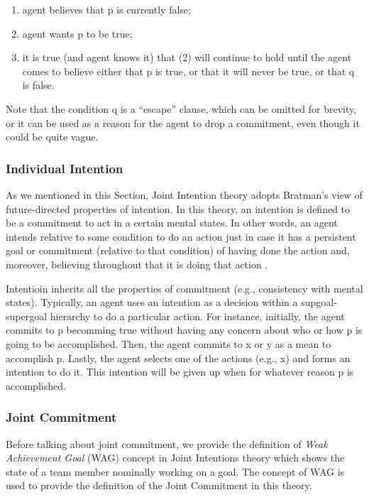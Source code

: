\documentclass[11pt]{article}
\begin{document}
\begin{enumerate}
  \item agent believes that p is currently false;
  \item agent wants p to be true;
  \item it is true (and agent knows it) that (2) will continue to hold until the
  agent comes to believe either that p is true, or that it will never be true,
  or that q is false.
\end{enumerate}

Note that the condition q is a ``escape'' clause, which can be omitted for
brevity, or it can be used as a reason for the agent to drop a commitment, even
though it could be quite vague.

\subsubsection{Individual Intention}
\label{sec:individual-intention}

As we mentioned in this Section, Joint Intention theory adopts Bratman's view of
future-directed properties of intention. In this theory, an intention is
defined to be a commitment to act in a certain mental states. In other words, an
agent intends relative to some condition to do an action just in case it has a
persistent goal or commitment (relative to that condition) of having done the
action and, moreover, believing throughout that it is doing that action
\cite{cohen:teamwork}.

Intentioin inherits all the properties of commitment (e.g., consistency with
mental states). Typically, an agent uses an intention as a decision within a
supgoal-supergoal hierarchy to do a particular action. For instance, initially,
the agent commits to p becomming true without having any concern about who or
how p is going to be accomplished. Then, the agent commits to x or y as a mean to
accomplish p. Lastly, the agent selects one of the actions (e.g., x) and forms
an intention to do it. This intention will be given up when for whatever reason
p is accomplished.

\subsubsection{Joint Commitment}
\label{sec:jpg}

Before talking about joint commitment, we provide the definition of \textit{Weak
Achievement Goal} (WAG) concept in Joint Intentions theory which shows the state
of a team member nominally working on a goal. The concept of WAG is used to
provide the definition of the Joint Commitment in this theory.\\
\end{document}
